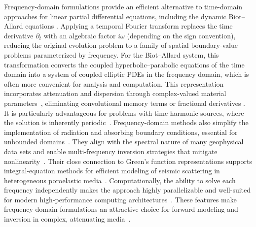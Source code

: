 \documentclass[pdflatex,sn-mathphys-num]{sn-jnl}
\theoremstyle{thmstyleone}%
\theoremstyle{thmstyletwo}%
\theoremstyle{thmstylethree}%
\theoremstyle{definition}
\begin{document}
	Frequency-domain formulations provide an efficient alternative to time-domain approaches for linear partial differential equations, including the dynamic Biot--Allard equations \cite{LiuGreenhalgh2019, Zhan2021, wang2024modelling, jiang2025modelling, yang2021frequency}. Applying a temporal Fourier transform replaces the time derivative $\partial_t$ with an algebraic factor $i\omega$ (depending on the sign convention), reducing the original evolution problem to a family of spatial boundary-value problems parameterized by frequency. For the Biot--Allard system, this transformation converts the coupled hyperbolic--parabolic equations of the time domain into a system of coupled elliptic PDEs in the frequency domain, which is often more convenient for analysis and computation. This representation incorporates attenuation and dispersion through complex-valued material parameters~\cite{jakobsen2003acoustic, jakobsen2009unified}, eliminating convolutional memory terms or fractional derivatives \cite{Carcione2022}. It is particularly advantageous for problems with time-harmonic sources, where the solution is inherently periodic~\cite{Zheng2013, Hu2019}. Frequency-domain methods also simplify the implementation of radiation and absorbing boundary conditions, essential for unbounded domains~\cite{Zhan2021}. They align with the spectral nature of many geophysical data sets and enable multi-frequency inversion strategies that mitigate nonlinearity~\cite{pratt1999seismic, sirgue2004efficient, jakobsen2020transition, yang2021frequency}. Their close connection to Green’s function representations supports integral-equation methods for efficient modeling of seismic scattering in heterogeneous poroelastic media~\cite{Kanaun2018, Huang2024}. Computationally, the ability to solve each frequency independently makes the approach highly parallelizable and well-suited for modern high-performance computing architectures~\cite{LiuGreenhalgh2019, ma2024cost}. These features make frequency-domain formulations an attractive choice for forward modeling and inversion in complex, attenuating media~\cite{LiuGreenhalgh2019, Zhan2021, Kanaun2018, Huang2024, yang2021frequency}.
	
\end{document}
